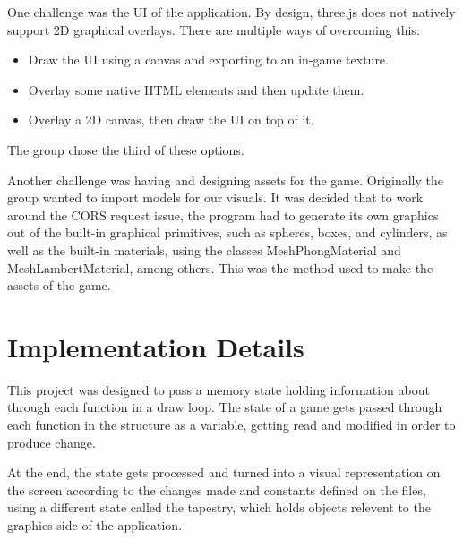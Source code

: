 \documentclass[11pt]{article}
\begin{document}
One challenge was the UI of the application. By design, three.js does not
natively support 2D graphical overlays. There are multiple ways of overcoming
this:
\begin{itemize}
\item Draw the UI using a canvas and exporting to an in-game texture.
\item Overlay some native HTML elements and then update them.
\item Overlay a 2D canvas, then draw the UI on top of it.
\end{itemize}

The group chose the third of these options.

Another challenge was having and designing assets for the game. Originally the
group wanted to import models for our visuals. 
It was decided that to work
around the CORS request issue, the program had to generate its own graphics out
of the built-in graphical primitives, such as spheres, boxes, and cylinders,
as well as the built-in materials, using the classes MeshPhongMaterial and
MeshLambertMaterial, among others. This was the method used to make the assets
of the game.
\section{Implementation Details}
\label{sec:org28b8572}
This project was designed to pass a memory state holding information about
through each function in a draw
loop. The state of a game gets passed through each function in the structure
as a variable, getting read and modified in order to produce change.

At the end, the state gets processed and turned into a visual representation on
the screen according to the changes made and constants defined on the files,
using a different state called the tapestry, which holds objects relevent to
the graphics side of the application.
\end{document}
